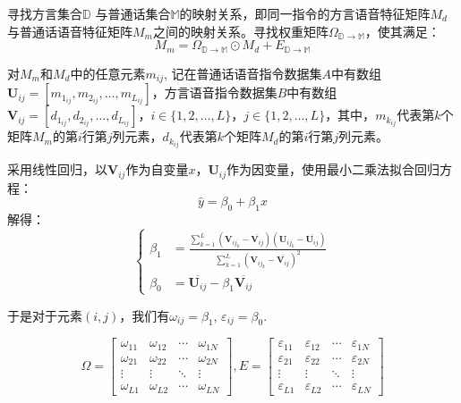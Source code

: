 \documentclass[lang=cn,cite=super]{elegantpaper}
\begin{document}
寻找方言集合$\mathbb{D}$ 与普通话集合$\mathbb{M}$的映射关系，即同一指令的方言语音特征矩阵$M_d$与普通话语音特征矩阵$M_m$之间的映射关系。寻找权重矩阵$\Omega_{\mathbb{D}\rightarrow \mathbb{M}}$，使其满足：
\begin{equation}
    M_m = \Omega_{\mathbb{D}\rightarrow  \mathbb{M}} \odot M_d + E_{\mathbb{D}\rightarrow \mathbb {M}}
\end{equation}

对$M_m$和$M_d$中的任意元素$m_{ij}$, 记在普通话语音指令数据集$A$中有数组$\mathbf{U}_{ij} = [m_{1_{ij}}, m_{2_{ij}}, \ldots, m_{L_{ij}}]$，方言语音指令数据集$B$中有数组$\mathbf{V}_{ij} = [d_{1_{ij}}, d_{2_{ij}}, \ldots, d_{L_{ij}}]$，$i \in \{ 1, 2, \ldots, L\}$，$j \in \{ 1, 2, \ldots, L\}$，其中，$m_{k_{ij}}$代表第$k$个矩阵$M_m$的第$i$行第$j$列元素，$d_{k_{ij}}$代表第$k$个矩阵$M_d$的第$i$行第$j$列元素。

采用线性回归，以$\mathbf{V}_{ij}$作为自变量$x$，$\mathbf{U}_{ij}$作为因变量，使用最小二乘法拟合回归方程：
\begin{equation}
    \hat{y} = \beta_0 + \beta_1 x
\end{equation}
解得：
\begin{equation}
    \left\{ 
    \begin{aligned}
           \beta_1 &= \frac{\sum_{k=1}^{L} (\mathbf{V}_{{ij}_k}-\overline{\mathbf{V}_{ij}}) (\mathbf{U}_{{ij}_k}-\overline{\mathbf{U}_{ij}})}{\sum_{k=1}^{L} (\mathbf{V}_{{ij}_k}-\overline{\mathbf{V}_{ij}})^2}\\
        \beta_0 &= \overline{\mathbf{U}_{ij}}-\beta_1 \overline{\mathbf{V}_{ij}}
    \end{aligned}
    \right.
\end{equation}

于是对于元素$(i,j)$，我们有$\omega_{ij} = \beta_1$, $\varepsilon_{ij} = \beta_0$.

\begin{equation}
    \Omega = \begin{bmatrix}
        \omega_{11} & \omega_{12} & \cdots & \omega_{1N}\\
        \omega_{21} & \omega_{22} & \cdots & \omega_{2N}\\
        \vdots & \vdots & \ddots & \vdots \\
        \omega_{L1} & \omega_{L2} & \cdots & \omega_{LN}
    \end{bmatrix}, 
    E = \begin{bmatrix}
        \varepsilon_{11} & \varepsilon_{12} & \cdots & \varepsilon_{1N}\\
        \varepsilon_{21} & \varepsilon_{22} & \cdots & \varepsilon_{2N}\\
        \vdots & \vdots & \ddots & \vdots \\
        \varepsilon_{L1} & \varepsilon_{L2} & \cdots & \varepsilon_{LN}
    \end{bmatrix}
\end{equation}
\end{document}
